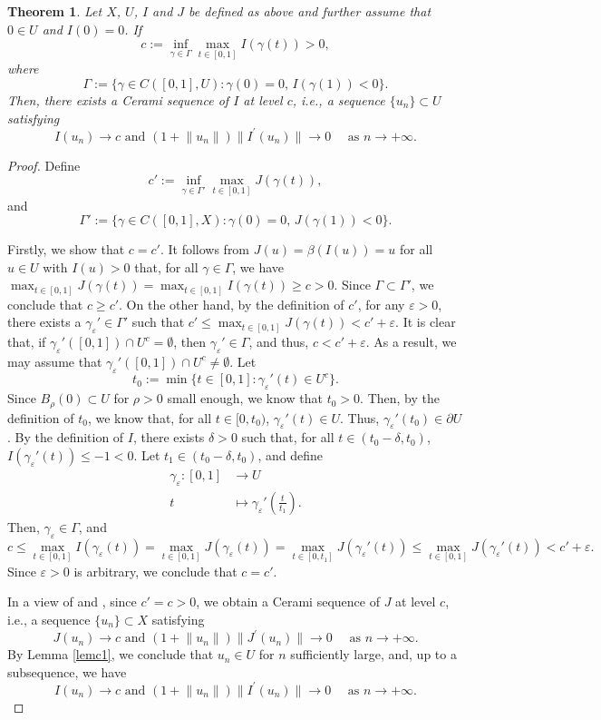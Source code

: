 \documentclass[11pt]{amsart}
\newtheorem{theorem}{Theorem}[section]
\newcommand{\norm}[1]{\lVert#1\rVert}
\numberwithin{equation}{section}
\begin{document}
\begin{theorem}\label{thmpopen}
 Let $X$, $U$, $I$ and $J$ be defined as above and further assume that $0 \in U$ and $I(0)=0$. If $$
c:=\inf_{\gamma \in \Gamma} \max _{t \in[0,1]} I(\gamma(t))>0,
$$
where
$$
\Gamma := \{\gamma \in C([0,1], U): \gamma(0)=0,\,  I(\gamma(1))<0\}.
$$
Then, there exists a Cerami sequence of $I$ at level $c$, i.e., a sequence $\{u_n\}\subset U$ satisfying
$$
I(u_{n}) \rightarrow c \text{ and } (1+\norm{u_{n}})\norm{I^{\prime}(u_{n})} \rightarrow 0 \quad \text{ as } n \to +\infty.
$$
\end{theorem}
\begin{proof}
Define
$$
c':=\inf_{\gamma \in \Gamma'} \max _{t \in[0,1]} J(\gamma(t)),
$$
and
$$
\Gamma':= \{\gamma \in C([0,1], X): \gamma(0)=0,\,  J(\gamma(1))<0\}.
$$

Firstly, we show that $c= c'$. It follows from $J(u)=\beta(I(u))=u$ for all $u \in U$ with $I(u)>0$ that, for all $\gamma \in \Gamma$, we have $\max _{t \in[0,1]} J(\gamma(t))=\max _{t \in[0,1]} I(\gamma(t))  \geq c>0$. Since $\Gamma \subset \Gamma'$, we conclude that $c \geq c'$. On the other hand, by the definition of $c'$, for any $\varepsilon>0$, there exists a $\gamma_\varepsilon' \in \Gamma'$ such that $c'\leq\max _{t \in[0,1]} J(\gamma(t))< c'+\varepsilon$. It is clear that, if $\gamma_\varepsilon'([0,1])\cap U^c = \emptyset$, then $\gamma_\varepsilon' \in \Gamma$, and thus, $c < c'+\varepsilon$. As a result, we may assume that $\gamma_\varepsilon'([0,1])\cap U^c \neq \emptyset$. Let $$t_0:= \min\{t \in [0,1]:\gamma_\varepsilon'(t)\in U^c\}.$$
Since $B_{\rho}(0)\subset U$ for $\rho>0$ small enough, we know that $t_0 >0$. Then, by the definition of $t_0$, we know that, for all $t \in [0,t_0)$, $\gamma_\varepsilon'(t) \in U$. Thus, $\gamma_\varepsilon'(t_0) \in\partial U$. By the definition of $I$, there exists $\delta>0$ such that, for all $t \in (t_0-\delta,t_0)$, $I(\gamma_\varepsilon'(t))\leq -1<0$. Let $t_1 \in (t_0-\delta,t_0)$, and define
$$
\begin{aligned}
    \gamma_\varepsilon: [0,1]&\to U\\
     t &\mapsto \gamma_\varepsilon'\left(\frac{t}{t_1}\right).
\end{aligned}
$$
Then, $\gamma_\varepsilon \in \Gamma$, and
$$
c\leq \max _{t \in[0,1]} I(\gamma_\varepsilon(t))=\max _{t \in[0,1]} J(\gamma_\varepsilon(t))=\max _{t \in[0,t_1]} J(\gamma_\varepsilon'(t))\leq \max _{t \in[0,1]} J(\gamma_\varepsilon'(t)) < c'+\varepsilon.
$$
Since $\varepsilon>0$ is arbitrary, we conclude that $c=c'$.

In a view of \cite[Theorem 2.9 and 4.2]{W} and \cite{Bar,Ce}, since $c'=c>0$, we obtain a Cerami sequence of $J$ at level $c$, i.e., a sequence $\{u_n\}\subset X$ satisfying
$$
J(u_{n}) \rightarrow c \text{ and } (1+\norm{u_{n}})\norm{J^{\prime}(u_{n})} \rightarrow 0 \quad \text{ as } n \to +\infty.
$$
By Lemma \ref{lemc1}, we conclude that $u_n \in U$ for $n$ sufficiently large, and, up to a subsequence, we have
$$
I(u_{n}) \rightarrow c \text{ and } (1+\norm{u_{n}})\norm{I^{\prime}(u_{n})} \rightarrow 0 \quad \text{ as } n \to +\infty.
$$
\end{proof}
\end{document}
